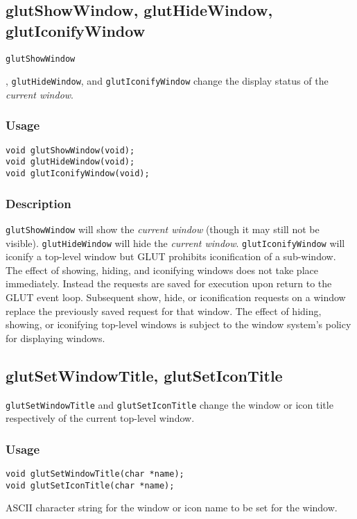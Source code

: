 {\raggedright
\subsection{glutShowWindow, glutHideWindow, glutIconifyWindow}

{\tt glutShowWindow}}, {\tt glutHideWindow}, and {\tt glutIconifyWindow}
change the display status of the {\em current window}.

\subsubsection*{Usage}
\begin{verbatim}
void glutShowWindow(void);
void glutHideWindow(void);
void glutIconifyWindow(void);
\end{verbatim}

\subsubsection*{Description}

{\tt glutShowWindow} will show the {\em current window} (though
it may still not be visible).  {\tt glutHideWindow} will hide
the {\em current window}.  {\tt glutIconifyWindow} will iconify
a top-level window but GLUT prohibits iconification of a sub-window.
The effect of showing, hiding, and iconifying windows does not
take place immediately.  Instead the requests are saved
for execution upon return to the GLUT event loop.
Subsequent show, hide, or iconification requests on a window
replace the previously saved request for that window.  The effect of hiding,
showing, or iconifying top-level windows is subject to the window
system's policy for displaying windows.

\subsection{glutSetWindowTitle, glutSetIconTitle}

{\tt glutSetWindowTitle} and {\tt glutSetIconTitle} change
the window or icon title respectively of the current top-level window.

\subsubsection*{Usage}
\begin{verbatim}
void glutSetWindowTitle(char *name);
void glutSetIconTitle(char *name);
\end{verbatim}
\begin{description}
\itemsep 0in
\item[\tt name]
ASCII character string for the window or icon name to be set for the window.
\end{description}

